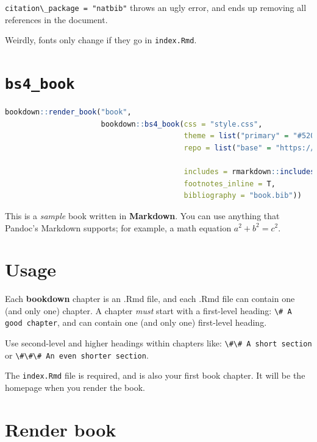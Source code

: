 \documentclass[
  9pt,
]{book}
\newcommand{\passthrough}[1]{#1}
\begin{document}
\passthrough{\lstinline!citation\_package = "natbib"!} throws an ugly error, and ends up removing all references in the document.

Weirdly, fonts only change if they go in \passthrough{\lstinline!index.Rmd!}.

\hypertarget{bs4_book}{%
\section{\texorpdfstring{\texttt{bs4\_book}}{bs4\_book}}\label{bs4_book}}

\begin{lstlisting}[language=R]
bookdown::render_book("book",
                      bookdown::bs4_book(css = "style.css",
                                         theme = list("primary" = "#52002E"),
                                         repo = list("base" = "https://github.com/brettellebi/PhD-thesis",
                                                                                         "branch" = "master", "subdir" = "book"),
                                         includes = rmarkdown::includes(in_header = "css.html"),
                                         footnotes_inline = T,
                                         bibliography = "book.bib"))
\end{lstlisting}

This is a \emph{sample} book written in \textbf{Markdown}. You can use anything that Pandoc's Markdown supports; for example, a math equation \(a^2 + b^2 = c^2\).

\hypertarget{usage}{%
\section{Usage}\label{usage}}

Each \textbf{bookdown} chapter is an .Rmd file, and each .Rmd file can contain one (and only one) chapter. A chapter \emph{must} start with a first-level heading: \passthrough{\lstinline!\# A good chapter!}, and can contain one (and only one) first-level heading.

Use second-level and higher headings within chapters like: \passthrough{\lstinline!\#\# A short section!} or \passthrough{\lstinline!\#\#\# An even shorter section!}.

The \passthrough{\lstinline!index.Rmd!} file is required, and is also your first book chapter. It will be the homepage when you render the book.

\hypertarget{render-book}{%
\section{Render book}\label{render-book}}
\end{document}
